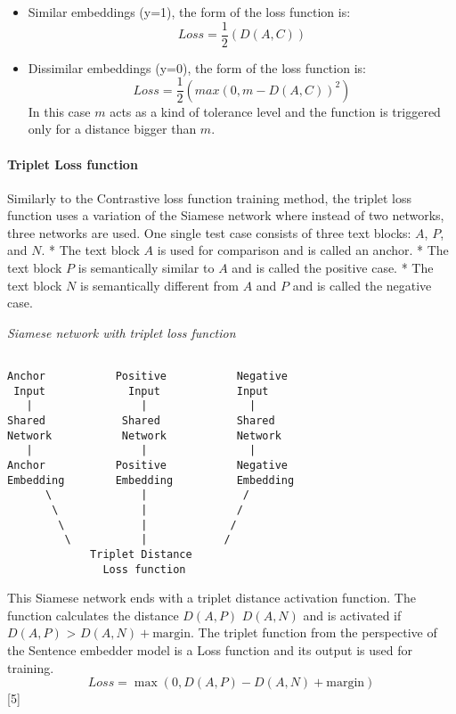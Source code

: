 \documentclass[11pt]{wseas}
\begin{document}
\begin{itemize}
\tightlist
\item
  Similar embeddings (y=1), the form of the loss function is: \[
   Loss = \frac{1}{2}(D(A,C))
   \]
\item
  Dissimilar embeddings (y=0), the form of the loss function is: \[
  Loss =  \frac{1}{2}(max(0,m-D(A,C))^2)
  \] In this case \(m\) acts as a kind of tolerance level and the
  function is triggered only for a distance bigger than \(m\).
\end{itemize}

\newpage

\paragraph{Triplet Loss function}\label{triplet-loss-function}

Similarly to the Contrastive loss function training method, the triplet
loss function uses a variation of the Siamese network where instead of
two networks, three networks are used. One single test case consists of
three text blocks: \(A\), \(P\), and \(N\). * The text block \(A\) is
used for comparison and is called an anchor. * The text block \(P\) is
semantically similar to \(A\) and is called the positive case. * The
text block \(N\) is semantically different from \(A\) and \(P\) and is
called the negative case.

\emph{Siamese network with triplet loss function}

\begin{verbatim}
                   
Anchor           Positive           Negative
 Input             Input            Input
   |                 |                |
Shared            Shared            Shared
Network           Network           Network
   |                 |                |
Anchor           Positive           Negative
Embedding        Embedding          Embedding
      \              |               /
       \             |              /  
        \            |             /
         \           |            /
             Triplet Distance
               Loss function     
\end{verbatim}

This Siamese network ends with a triplet distance activation function.
The function calculates the distance \(D(A,P)\) \(D(A,N)\) and is
activated if \(D(A,P)\) \textgreater{} \(D(A,N) + \text{margin}\). The
triplet function from the perspective of the Sentence embedder model is
a Loss function and its output is used for training. \[
Loss = \max(0, D(A,P) - D(A,N) + \text{margin})
\] {[}5{]}
\end{document}
